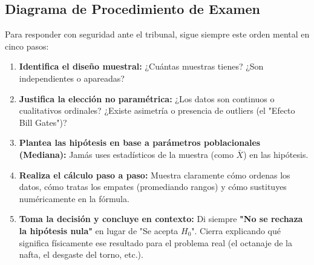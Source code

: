 \documentclass[11pt,a4paper]{article}
\begin{document}
\subsection{Diagrama de Procedimiento de Examen}
Para responder con seguridad ante el tribunal, sigue siempre este orden mental en cinco pasos:
\begin{enumerate}
    \item \textbf{Identifica el diseño muestral:} ¿Cuántas muestras tienes? ¿Son independientes o apareadas?
    \item \textbf{Justifica la elección no paramétrica:} ¿Los datos son continuos o cualitativos ordinales? ¿Existe asimetría o presencia de outliers (el "Efecto Bill Gates")?
    \item \textbf{Plantea las hipótesis en base a parámetros poblacionales (Mediana):} Jamás uses estadísticos de la muestra (como $\bar{X}$) en las hipótesis.
    \item \textbf{Realiza el cálculo paso a paso:} Muestra claramente cómo ordenas los datos, cómo tratas los empates (promediando rangos) y cómo sustituyes numéricamente en la fórmula.
    \item \textbf{Toma la decisión y concluye en contexto:} Di siempre \textbf{"No se rechaza la hipótesis nula"} en lugar de "Se acepta $H_0$". Cierra explicando qué significa físicamente ese resultado para el problema real (el octanaje de la nafta, el desgaste del torno, etc.).
\end{enumerate}
\end{document}
